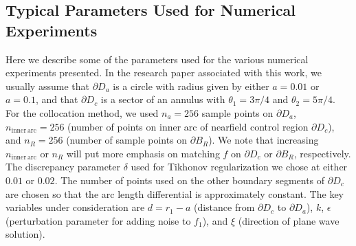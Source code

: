 \documentclass[11pt]{amsart}
\theoremstyle{definition}
\theoremstyle{definition}
\theoremstyle{definition}
\begin{document}
\subsection{Typical Parameters Used for Numerical Experiments\label{subsec:parametersetup}}
Here we describe some of the parameters used for the various numerical experiments presented. In the research paper associated with this work, we usually assume that $\partial D_{a}$ is a circle with radius given by either $a = 0.01$ or $a = 0.1$, and that $\partial D_{c}$ is a sector of an annulus with $\theta_{1} = 3\pi/4$ and $\theta_{2} = 5\pi/4$. For the collocation method, we used $n_{a} = 256$ sample points on $\partial D_{a}$, $n_{\mathrm{inner \, arc}} = 256$ (number of points on inner arc of nearfield control region $\partial D_{c}$), and $n_{R} = 256$ (number of sample points on $\partial B_{R}$). We note that increasing $n_{\mathrm{inner \, arc}}$ or $n_{R}$ will put more emphasis on matching $f$ on $\partial D_{c}$ or $\partial B_{R}$, respectively. The discrepancy parameter $\delta$ used for Tikhonov regularization we chose at either $0.01$ or $0.02$. The number of points used on the other boundary segments of $\partial D_{c}$ are chosen so that the arc length differential is approximately constant. The key variables under consideration are $d = r_{1} - a$ (distance from $\partial D_{c}$ to $\partial D_{a}$), $k$, $\epsilon$ (perturbation parameter for adding noise to $f_{1}$), and $\xi$ (direction of plane wave solution).
\end{document}
